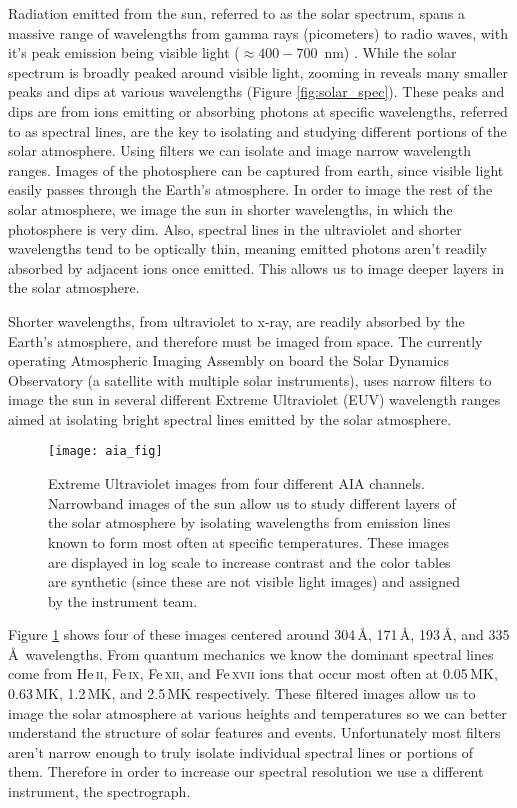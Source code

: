 Radiation emitted from the sun, referred to as the solar spectrum, spans a massive range of wavelengths from gamma rays (picometers) to radio waves, with it's peak emission being visible light ($\approx400-700$\, nm) \citep{JudgeBook}.
While the solar spectrum is broadly peaked around visible light, zooming in reveals many smaller peaks and dips at various wavelengths (Figure \ref{fig:solar_spec}).
These peaks and dips are from ions emitting or absorbing photons at specific wavelengths, referred to as spectral lines, are the key to isolating and studying different portions of the solar atmosphere.
Using filters we can isolate and image narrow wavelength ranges.
Images of the photosphere can be captured from earth, since visible light easily passes through the Earth's atmosphere.
In order to image the rest of the solar atmosphere, we image the sun in shorter wavelengths, in which the photosphere is very dim.
Also, spectral lines in the ultraviolet and shorter wavelengths tend to be optically thin, meaning emitted photons aren't readily absorbed by adjacent ions once emitted.
This allows us to image deeper layers in the solar atmosphere.

Shorter wavelengths, from ultraviolet to x-ray, are readily absorbed by the Earth's atmosphere, and therefore must be imaged from space. 
The currently operating Atmospheric Imaging Assembly \citep[AIA:][]{Lemen2012} on board the Solar Dynamics Observatory (a satellite with multiple solar instruments), uses narrow filters to image the sun in several different Extreme Ultraviolet (EUV) wavelength ranges aimed at isolating bright spectral lines emitted by the solar atmosphere.
\begin{figure}
	\texttt{[image: aia\_fig]}
	\caption{Extreme Ultraviolet images from four different AIA channels. Narrowband images of the sun allow us to study different layers of the solar atmosphere by isolating wavelengths from emission lines known to form most often at specific temperatures. These images are displayed in log scale to increase contrast and the color tables are synthetic (since these are not visible light images) and assigned by the instrument team.}
	\label{fig:AIA}
\end{figure}
Figure \ref{fig:AIA} shows four of these images centered around 304\,\AA, 171\,\AA, 193\,\AA, and 335\,\AA\  wavelengths.
From quantum mechanics we know the dominant spectral lines come from He\,\textsc{ii}, Fe\,\textsc{ix}, Fe\,\textsc{xii}, and Fe\,\textsc{xvii}  ions that occur most often at 0.05\,MK, 0.63\,MK, 1.2\,MK, and 2.5\,MK respectively.
These filtered images allow us to image the solar atmosphere at various heights and temperatures so we can better understand the structure of solar features and events.
Unfortunately most filters aren't narrow enough to truly isolate individual spectral lines or portions of them.
Therefore in order to increase our spectral resolution we use a different instrument, the spectrograph.


